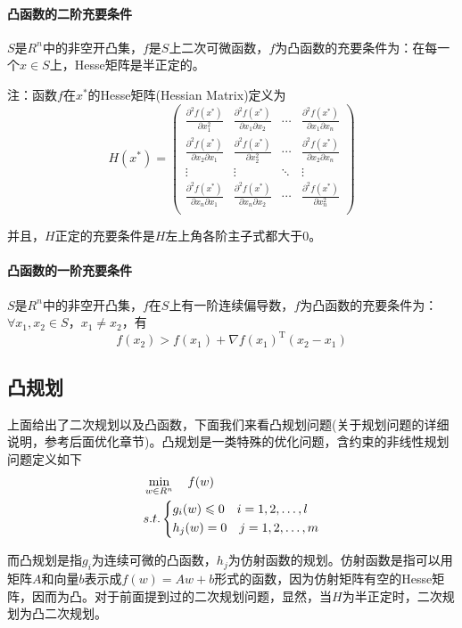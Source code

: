 		\paragraph{凸函数的二阶充要条件}
		$S$是$R^n$中的非空开凸集，$f$是$S$上二次可微函数，$f$为凸函数的充要条件为：在每一个$x\in S$上，Hesse矩阵是半正定的。
		\par
		注：函数$f$在$x^*$的Hesse矩阵(Hessian Matrix)定义为
		\[
		H(x^*)=\begin{pmatrix}
		\frac{\partial ^2f(x^*)}{\partial x_1^2} & \frac{\partial ^2f(x^*)}{\partial x_1\partial x_2} & \cdots & \frac{\partial ^2f(x^*)}{\partial x_1\partial x_n} \\

		\frac{\partial ^2f(x^*)}{\partial x_2\partial x_1} & \frac{\partial ^2f(x^*)}{\partial x_2^2} & \cdots & \frac{\partial ^2f(x^*)}{\partial x_2\partial x_n} \\

		\vdots & \vdots & \ddots & \vdots\\

		\frac{\partial ^2f(x^*)}{\partial x_n\partial x_1} & \frac{\partial ^2f(x^*)}{\partial x_n\partial x_2} & \cdots & \frac{\partial ^2f(x^*)}{\partial x_n^2} \\
		\end{pmatrix}
		\]
		\par
		并且，$H$正定的充要条件是$H$左上角各阶主子式都大于0。
		\paragraph{凸函数的一阶充要条件}
		$S$是$R^n$中的非空开凸集，$f$在$S$上有一阶连续偏导数，$f$为凸函数的充要条件为：$\forall x_1,x_2\in S$，$x_1 \neq x_2$，有
		\[
		f(x_2)>f(x_1)+\nabla f(x_1)^\mathrm{T}(x_2-x_1)
		\]

	\subsection{凸规划}
		\par
		上面给出了二次规划以及凸函数，下面我们来看凸规划问题(关于规划问题的详细说明，参考后面优化章节)。凸规划是一类特殊的优化问题，含约束的非线性规划问题定义如下
		\begin{align*}
		& \min_{w\in R^n}\quad f(w)\\
		& s.t. \left\{
		\begin{aligned}
		& g_i(w) \leqslant 0\quad i=1,2,\dots ,l \notag\\
		& h_j(w) = 0\quad j=1,2,\dots ,m \notag
		\end{aligned}
		\right.
		\end{align*}
		\par
		而凸规划是指$g_i$为连续可微的凸函数，$h_j$为仿射函数的规划。仿射函数是指可以用矩阵$A$和向量$b$表示成$f(w)=Aw+b$形式的函数，因为仿射矩阵有空的Hesse矩阵，因而为凸。对于前面提到过的二次规划问题，显然，当$H$为半正定时，二次规划为凸二次规划。

